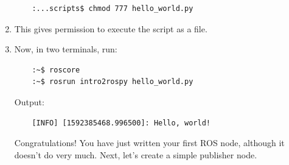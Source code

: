 \documentclass{article}
\begin{document}
\begin{enumerate}
\begin{verbatim}
    :...scripts$ chmod 777 hello_world.py
        \end{verbatim}
        \item This gives permission to execute the script as a file.
        \item Now, in two terminals, run:
        \begin{verbatim}
    :~$ roscore
    :~$ rosrun intro2rospy hello_world.py
        \end{verbatim}
        Output:
        \begin{verbatim}
    [INFO] [1592385468.996500]: Hello, world! 
        \end{verbatim}
        Congratulations! You have just written your first ROS node, although it doesn't 
        do very much. Next, let's create a simple publisher node.
    \end{enumerate}
    \newpage
\end{document}
